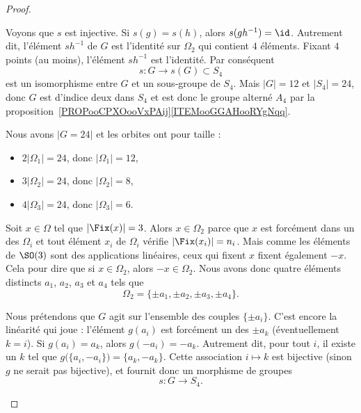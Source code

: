 \begin{proof}
\begin{subproof}
		Voyons que \( s\) est injective. Si \( s(g)=s(h)\), alors \( s(gh^{-1})=\id\). Autrement dit, l'élément \( sh^{-1}\) de \( G\) est l'identité sur \( \Omega_2\) qui contient \( 4\) éléments. Fixant \( 4\) points (au moins), l'élément \( sh^{-1}\) est l'identité. Par conséquent
		\begin{equation}
			s\colon G\to s(G)\subset S_4
		\end{equation}
		est un isomorphisme entre \( G\) et un sous-groupe de \( S_4\). Mais \( | G |=12\) et \( | S_4 |=24\), donc \( G\) est d'indice deux dans \( S_4\) et est donc le groupe alterné \( A_4\) par la proposition~\ref{PROPooCPXOooVxPAij}\ref{ITEMooGGAHooRYgNqq}.

		\spitem[Le cas \( (2,3,4)\)]
		Nous avons \( | G=24 |\) et les orbites ont pour taille :
		\begin{itemize}
			\item \( 2| \Omega_1 |=24\), donc \( | \Omega_1 |=12\),
			\item \( 3| \Omega_2 |=24\), donc \( | \Omega_2 |=8\),
			\item \( 4| \Omega_3 |=24\), donc  \( | \Omega_3 |=6\).
		\end{itemize}

		\begin{subproof}
			Soit \( x\in \Omega\) tel que \( | \Fix(x) |=3\). Alors \( x\in\Omega_2\) parce que \( x\) est forcément dans un des \( \Omega_i\) et tout élément \( x_i\) de \( \Omega_i\) vérifie \( | \Fix(x_i) |=n_i\). Mais comme les éléments de \( \SO(3)\) sont des applications linéaires, ceux qui fixent \( x\) fixent également \( -x\). Cela pour dire que si \( x\in\Omega_2\), alors \( -x\in\Omega_2\). Nous avons donc quatre éléments distincts \( a_1\), \( a_2\), \( a_3\) et \( a_4\) tels que
			\begin{equation}
				\Omega_2=\{ \pm a_1,\pm a_2,\pm a_3,\pm a_4 \}.
			\end{equation}

			Nous prétendons que \( G\) agit sur l'ensemble des couples \( \{ \pm a_i \}\). C'est encore la linéarité qui joue : l'élément \( g(a_i)\) est forcément un des \( \pm a_k\) (éventuellement \( k=i\)). Si \( g(a_i)=a_k\), alors \( g(-a_i)=-a_k\). Autrement dit, pour tout \( i\), il existe un \( k\) tel que \( g\big( \{ a_i,-a_i \} \big)=\{ a_k,-a_k \}\). Cette association \( i\mapsto k\) est bijective (sinon \( g\) ne serait pas bijective), et fournit donc un morphisme de groupes
			\begin{equation}
				s\colon G\to S_4.
			\end{equation}


\end{subproof}
\end{subproof}
\end{proof}
